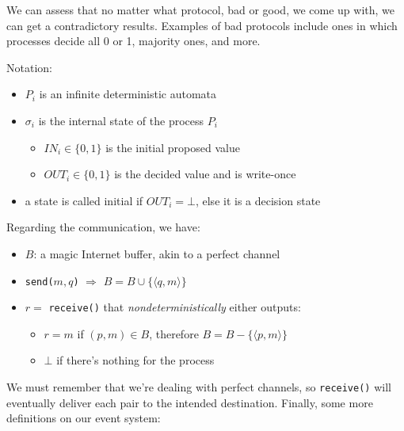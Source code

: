 \documentclass[a4paper,11pt,hidelinks]{article}
\begin{document}
We can assess that no matter what protocol, bad or good, we come up with, we can get a contradictory results. Examples of bad protocols include ones in which processes decide all 0 or 1, majority ones, and more.

\noindent Notation:

\begin{itemize}
    \item $P_i$ is an infinite deterministic automata
    \item $\sigma_i$ is the internal state of the process $P_i$
          \begin{itemize}
              \item $IN_i \in \{0, 1\}$ is the initial proposed value
              \item $OUT_i \in \{0, 1\}$ is the decided value and is write-once
          \end{itemize}
    \item a state is called initial if $OUT_i = \bot$, else it is a decision state
\end{itemize}

\noindent Regarding the communication, we have:

\begin{itemize}
    \item $B$: a magic Internet buffer, akin to a perfect channel
    \item \verb=send(=$m, q$\verb=)= $\Rightarrow$ $B = B \cup \{\langle q, m \rangle\}$
    \item $r = $ \verb=receive(=\verb=)= that \textit{nondeterministically} either outputs:
          \begin{itemize}
              \item $r = m$ if $(p, m) \in B$, therefore $B = B - \{\langle p, m \rangle\}$
              \item $\bot$ if there's nothing for the process
          \end{itemize}
\end{itemize}

\noindent We must remember that we're dealing with perfect channels, so \verb=receive()= will eventually deliver each pair to the intended destination. Finally, some more definitions on our event system:
\end{document}
